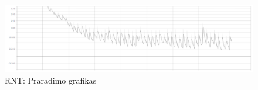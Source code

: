 \documentclass{VUMIFPSbakalaurinis}
\begin{document}
\begin{figure}[H]
	\centering
	\includegraphics[scale=0.3]{img/3/loss}
	\caption{RNT: Praradimo grafikas}
	\label{img:25loss}
\end{figure}
\end{document}
